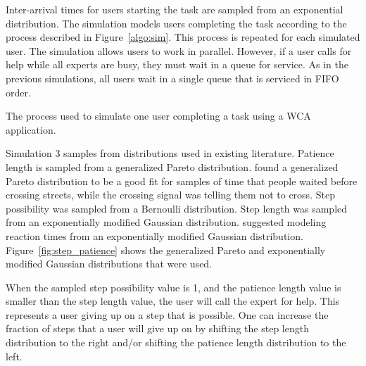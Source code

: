 Inter-arrival times for users starting the task are sampled from an exponential
distribution.
The simulation models users completing the task according to the process
described in Figure~\ref{algo:sim}.
This process is repeated for each simulated user.
The simulation allows users to work in parallel.
However, if a user calls for help while all experts are busy, they must wait in
a queue for service.
As in the previous simulations, all users wait in a single queue that is
serviced in FIFO order.

\begin{algorithm}[H]
  \caption{
    The process used to simulate one user completing a task using a WCA
    application.
  }\label{algo:sim}
\end{algorithm}

Simulation 3 samples from distributions used in existing literature.
Patience length is sampled from a generalized Pareto distribution.
\citet{patience} found a generalized Pareto distribution to be a good fit for
samples of time that people waited before crossing streets, while the crossing
signal was telling them not to cross.
Step possibility was sampled from a Bernoulli distribution.
Step length was sampled from an exponentially modified Gaussian distribution.
\citet{dawson1988fitting} suggested modeling reaction times from an
exponentially modified Gaussian distribution.
Figure~\ref{fig:step_patience} shows the generalized Pareto and exponentially
modified Gaussian distributions that were used.

When the sampled step possibility value is 1, and the patience length value is
smaller than the step length value, the user will call the expert for help.
This represents a user giving up on a step that is possible.
One can increase the fraction of steps that a user will give up on by shifting
the step length distribution to the right and/or shifting the patience length
distribution to the left.

